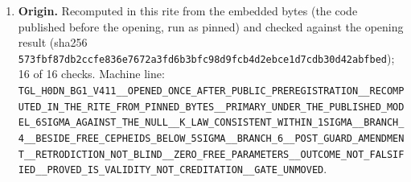 \begin{center}
{{\begin{enumerate}
\item \textbf{Origin.} Recomputed in this rite from the embedded bytes (the code published before the opening, run as pinned) and checked against the opening result (sha256 \texttt{573fbf87db2ccfe836e7672a3fd6b3bfc98d9fcb4d2ebce1d7cdb30d42abfbed}); 16 of 16 checks. Machine line: \texttt{TGL\_\allowbreak{}H0DN\_\allowbreak{}BG1\_\allowbreak{}V411\_\allowbreak{}\_\allowbreak{}OPENED\_\allowbreak{}ONCE\_\allowbreak{}AFTER\_\allowbreak{}PUBLIC\_\allowbreak{}PREREGISTRATION\_\allowbreak{}\_\allowbreak{}RECOMPUTED\_\allowbreak{}IN\_\allowbreak{}THE\_\allowbreak{}RITE\_\allowbreak{}FROM\_\allowbreak{}PINNED\_\allowbreak{}BYTES\_\allowbreak{}\_\allowbreak{}PRIMARY\_\allowbreak{}UNDER\_\allowbreak{}THE\_\allowbreak{}PUBLISHED\_\allowbreak{}MODEL\_\allowbreak{}6SIGMA\_\allowbreak{}AGAINST\_\allowbreak{}THE\_\allowbreak{}NULL\_\allowbreak{}\_\allowbreak{}K\_\allowbreak{}LAW\_\allowbreak{}CONSISTENT\_\allowbreak{}WITHIN\_\allowbreak{}1SIGMA\_\allowbreak{}\_\allowbreak{}BRANCH\_\allowbreak{}4\_\allowbreak{}\_\allowbreak{}BESIDE\_\allowbreak{}FREE\_\allowbreak{}CEPHEIDS\_\allowbreak{}BELOW\_\allowbreak{}5SIGMA\_\allowbreak{}\_\allowbreak{}BRANCH\_\allowbreak{}6\_\allowbreak{}\_\allowbreak{}POST\_\allowbreak{}GUARD\_\allowbreak{}AMENDMENT\_\allowbreak{}\_\allowbreak{}RETRODICTION\_\allowbreak{}NOT\_\allowbreak{}BLIND\_\allowbreak{}\_\allowbreak{}ZERO\_\allowbreak{}FREE\_\allowbreak{}PARAMETERS\_\allowbreak{}\_\allowbreak{}OUTCOME\_\allowbreak{}NOT\_\allowbreak{}FALSIFIED\_\allowbreak{}\_\allowbreak{}PROVED\_\allowbreak{}IS\_\allowbreak{}VALIDITY\_\allowbreak{}NOT\_\allowbreak{}CREDITATION\_\allowbreak{}\_\allowbreak{}GATE\_\allowbreak{}UNMOVED}.
\end{enumerate}
}}\end{center}\vspace{4pt}
